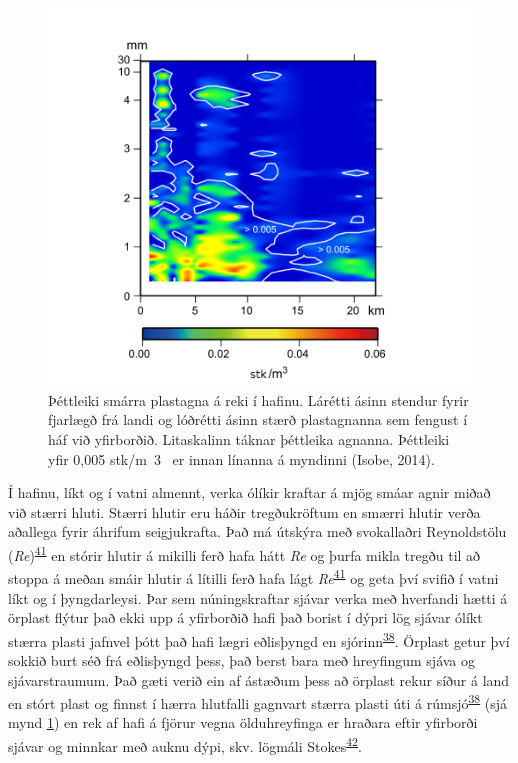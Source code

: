 \documentclass[icelandic,]{book}
\begin{document}
\begin{figure}

{\centering \includegraphics[width=0.8\linewidth]{myndir/DriftDensity_isobe2014} 

}

\caption{Þéttleiki smárra plastagna á reki í hafinu. Lárétti ásinn stendur fyrir fjarlægð frá landi og lóðrétti ásinn stærð plastagnanna sem fengust í háf við yfirborðið. Litaskalinn táknar þéttleika agnanna. Þéttleiki yfir 0,005 stk/m~3~ er innan línanna á myndinni (Isobe, 2014).}\label{fig:DriftDensity}
\end{figure}

Í hafinu, líkt og í vatni almennt, verka ólíkir kraftar á mjög smáar agnir miðað við stærri hluti. Stærri hlutir eru háðir tregðukröftum en smærri hlutir verða aðallega fyrir áhrifum seigjukrafta. Það má útskýra með svokallaðri Reynoldstölu (\emph{Re})\textsuperscript{\protect\hyperlink{ref-levinton1995marine}{41}} en stórir hlutir á mikilli ferð hafa hátt \emph{Re} og þurfa mikla tregðu til að stoppa á meðan smáir hlutir á lítilli ferð hafa lágt \emph{Re}\textsuperscript{\protect\hyperlink{ref-levinton1995marine}{41}} og geta því svifið í vatni líkt og í þyngdarleysi. Þar sem núningskraftar sjávar verka með hverfandi hætti á örplast flýtur það ekki upp á yfirborðið hafi það borist í dýpri lög sjávar ólíkt stærra plasti jafnvel þótt það hafi lægri eðlisþyngd en sjórinn\textsuperscript{\protect\hyperlink{ref-isobe2014selective}{38}}. Örplast getur því sokkið burt séð frá eðlisþyngd þess, það berst bara með hreyfingum sjáva og sjávarstraumum. Það gæti verið ein af ástæðum þess að örplast rekur síður á land en stórt plast og finnst í hærra hlutfalli gagnvart stærra plasti úti á rúmsjó\textsuperscript{\protect\hyperlink{ref-isobe2014selective}{38}} (sjá mynd \ref{fig:DriftDensity}) en rek af hafi á fjörur vegna ölduhreyfinga er hraðara eftir yfirborði sjávar og minnkar með auknu dýpi, skv. lögmáli Stokes\textsuperscript{\protect\hyperlink{ref-stokes1851effect}{42}}.
\end{document}
